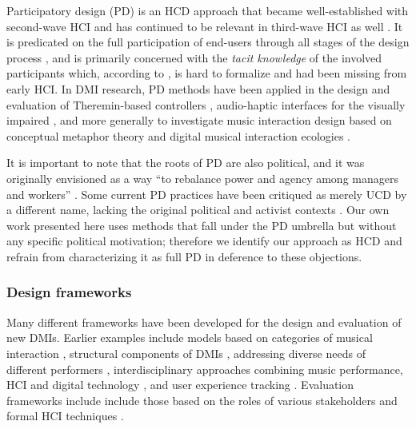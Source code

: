 \documentclass[letterpaper, 12pt]{article}
\begin{document}
Participatory design (PD) is an HCD approach that became well-established with second-wave HCI \citep{Bodker2015} and has continued to be relevant in third-wave HCI as well \citep{Muller2012}. It is predicated on the full participation of end-users through all stages of the design process \citep{Steen2011}, and is primarily concerned with the \emph{tacit knowledge} of the involved participants which, according to \citet{Spinuzzi2005}, is hard to formalize and had been missing from early HCI. In DMI research, PD methods have been applied in the design and evaluation of Theremin-based controllers \citep{Geiger2008}, audio-haptic interfaces for the visually impaired \citep{Metatla2016}, and more generally to investigate music interaction design based on conceptual metaphor theory \citep{wilkie2013towards} and digital musical interaction ecologies \citep{Fyans:2012}.

It is important to note that the roots of PD are also political, and it was originally envisioned as a way ``to rebalance power and agency among managers and workers'' \citep[p. 1]{Bannon2018}. Some current PD practices have been critiqued as merely UCD by a different name, lacking the original political and activist contexts \citep{Bannon2018}. Our own work presented here uses methods that fall under the PD umbrella but without any specific political motivation; therefore we identify our approach as HCD and refrain from characterizing it as full PD in deference to these objections.




\subsubsection{Design frameworks}
\label{ch3-sec:design-frameworks}

Many different frameworks have been developed for the design and evaluation of new DMIs. Earlier examples include models based on categories of musical interaction \citep{Bongers2000a}, structural components of DMIs \citep{Wanderley2004}, addressing diverse needs of different performers \citep{Jorda2004, Jorda2004b}, interdisciplinary approaches combining music performance, HCI and digital technology \citep{Overholt2009}, and user experience tracking \citep{fmorreale:2014}. Evaluation frameworks include include those based on the roles of various stakeholders \citep{OModhrain2011a} and formal HCI techniques \citep{Young2015a}.
\end{document}
